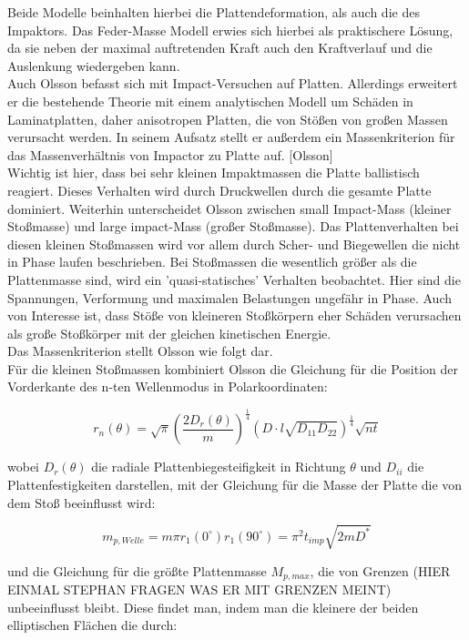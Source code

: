 Beide Modelle beinhalten hierbei die Plattendeformation, als auch die des Impaktors. Das Feder-Masse Modell erwies sich hierbei als praktischere Lösung, da sie neben der maximal auftretenden Kraft auch den Kraftverlauf und die Auslenkung wiedergeben kann. \\
Auch Olsson befasst sich mit Impact-Versuchen auf Platten. Allerdings erweitert er die bestehende Theorie mit einem analytischen Modell um Schäden in Laminatplatten, daher anisotropen Platten, die von Stößen von großen Massen verursacht werden. In seinem Aufsatz stellt er außerdem ein Massenkriterion für das Massenverhältnis von Impactor zu Platte auf. [Olsson]\\
Wichtig ist hier, dass bei sehr kleinen Impaktmassen die Platte ballistisch reagiert. Dieses Verhalten wird durch Druckwellen durch die gesamte Platte dominiert. Weiterhin unterscheidet Olsson zwischen small Impact-Mass (kleiner Stoßmasse) und large impact-Mass (großer Stoßmasse). Das Plattenverhalten bei diesen kleinen Stoßmassen wird vor allem durch Scher- und Biegewellen die nicht in Phase laufen beschrieben. Bei Stoßmassen die wesentlich größer als die Plattenmasse sind, wird ein 'quasi-statisches' Verhalten beobachtet. Hier sind die Spannungen, Verformung und maximalen Belastungen ungefähr in Phase. Auch von Interesse ist, dass Stöße von kleineren Stoßkörpern eher Schäden verursachen als große Stoßkörper mit der gleichen kinetischen Energie.\\
Das Massenkriterion stellt Olsson wie folgt dar.\\
Für die kleinen Stoßmassen kombiniert Olsson die Gleichung für die Position der Vorderkante des n-ten Wellenmodus in Polarkoordinaten:

\begin{equation}
	r_{n}(\theta) = \sqrt{\pi}(\frac{2D_{r}(\theta)}{m})^{\frac{1}{4}} (D \cdot l\sqrt{D_{11}D_{22}})^{\frac{1}{4}}\sqrt{nt}
\end{equation}

wobei $D_{r}(\theta)$ die radiale Plattenbiegesteifigkeit in Richtung $\theta$ und $D_{ii}$ die Plattenfestigkeiten darstellen, mit der Gleichung für die Masse der Platte die von dem Stoß beeinflusst wird:

\begin{equation}
	m_{p,Welle} = m \pi r_{1}(0^{\circ}) r_{1}(90^{\circ}) = \pi^{2} t_{imp} \sqrt{2mD^{*}}
\end{equation}

und die Gleichung für die größte Plattenmasse $M_{p,max}$, die von Grenzen (HIER EINMAL STEPHAN FRAGEN WAS ER MIT GRENZEN MEINT) unbeeinflusst bleibt. Diese findet man, indem man die kleinere der beiden elliptischen Flächen die durch:


